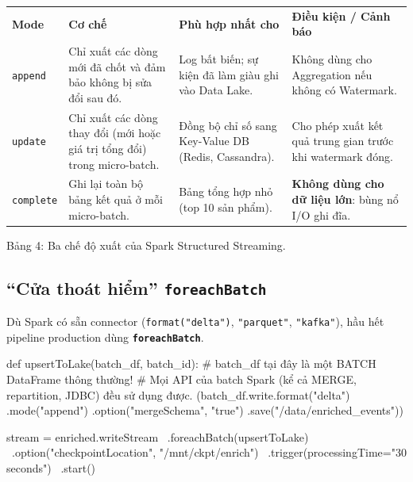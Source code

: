 \documentclass[12pt]{article}
\begin{document}
\noindent
\begin{longtable}{@{}>{\RaggedRight\arraybackslash}p{2.2cm}>{\RaggedRight\arraybackslash}p{4.6cm}>{\RaggedRight\arraybackslash}p{4.4cm}>{\RaggedRight\arraybackslash}p{4.4cm}@{}}
\rowcolor{rowLavender}
\textbf{Mode} & \textbf{Cơ chế} & \textbf{Phù hợp nhất cho} & \textbf{Điều kiện / Cảnh báo} \\
\addlinespace[3pt]
\endhead
\texttt{append} & Chỉ xuất các dòng mới đã chốt và đảm bảo không bị sửa đổi sau đó. & Log bất biến; sự kiện đã làm giàu ghi vào Data Lake. & Không dùng cho Aggregation nếu không có Watermark. \\
\addlinespace[3pt]
\texttt{update} & Chỉ xuất các dòng thay đổi (mới hoặc giá trị tổng đổi) trong micro-batch. & Đồng bộ chỉ số sang Key-Value DB (Redis, Cassandra). & Cho phép xuất kết quả trung gian trước khi watermark đóng. \\
\addlinespace[3pt]
\texttt{complete} & Ghi lại toàn bộ bảng kết quả ở mỗi micro-batch. & Bảng tổng hợp nhỏ (top 10 sản phẩm). & \textbf{Không dùng cho dữ liệu lớn}: bùng nổ I/O ghi đĩa. \\
\end{longtable}

\begin{captionbelowboxaivn}
Bảng 4: Ba chế độ xuất của Spark Structured Streaming.
\end{captionbelowboxaivn}

\subsection{``Cửa thoát hiểm'' \texttt{foreachBatch}}

Dù Spark có sẵn connector (\texttt{format("delta")}, \texttt{"parquet"}, \texttt{"kafka"}), hầu hết pipeline production dùng \textbf{\texttt{foreachBatch}}.

\begin{aivnpybox}[foreachBatch]
def upsertToLake(batch_df, batch_id):
    # batch_df tại đây là một BATCH DataFrame thông thường!
    # Mọi API của batch Spark (kể cả MERGE, repartition, JDBC) đều sử dụng được.
    (batch_df.write.format("delta")
        .mode("append")
        .option("mergeSchema", "true")
        .save("/data/enriched_events"))

stream = enriched.writeStream \
    .foreachBatch(upsertToLake) \
    .option("checkpointLocation", "/mnt/ckpt/enrich") \
    .trigger(processingTime="30 seconds") \
    .start()
\end{aivnpybox}
\end{document}
